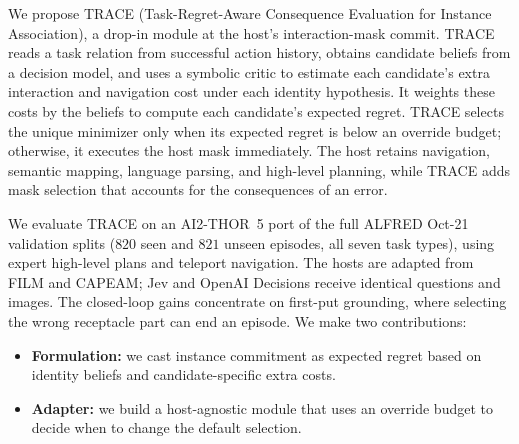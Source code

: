 \documentclass[conference]{IEEEtran}
\begin{document}
We propose TRACE (Task-Regret-Aware Consequence Evaluation for Instance Association), a drop-in module at the host's interaction-mask commit.
TRACE reads a task relation from successful action history, obtains candidate beliefs from a decision model, and uses a symbolic critic to estimate each candidate's extra interaction and navigation cost under each identity hypothesis.
It weights these costs by the beliefs to compute each candidate's expected regret.
TRACE selects the unique minimizer only when its expected regret is below an override budget; otherwise, it executes the host mask immediately.
The host retains navigation, semantic mapping, language parsing, and high-level planning, while TRACE adds mask selection that accounts for the consequences of an error.

We evaluate TRACE on an AI2-THOR~5 port of the full ALFRED Oct-21 validation splits ($820$ seen and $821$ unseen episodes, all seven task types), using expert high-level plans and teleport navigation.
The hosts are adapted from FILM and CAPEAM; Jev and OpenAI Decisions receive identical questions and images.
The closed-loop gains concentrate on first-put grounding, where selecting the wrong receptacle part can end an episode.
We make two contributions:
\begin{itemize}
  \item \textbf{Formulation:} we cast instance commitment as expected regret based on identity beliefs and candidate-specific extra costs.
  \item \textbf{Adapter:} we build a host-agnostic module that uses an override budget to decide when to change the default selection.
\end{itemize}
\end{document}

